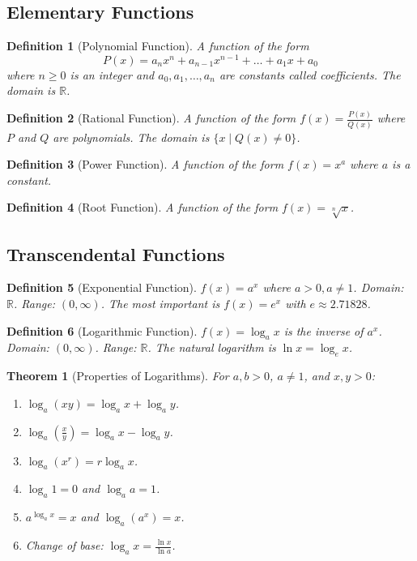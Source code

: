\documentclass[11pt,a4paper]{article}
\newtheorem{theorem}{Theorem}
\newtheorem{definition}{Definition}
\begin{document}
\subsection{Elementary Functions}
\begin{definition}[Polynomial Function]
A function of the form
\[
P(x) = a_n x^n + a_{n-1} x^{n-1} + \dots + a_1 x + a_0
\]
where $n \geq 0$ is an integer and $a_0, a_1, \dots, a_n$ are constants called coefficients. The domain is $\mathbb{R}$.
\end{definition}
\begin{definition}[Rational Function]
A function of the form $f(x) = \frac{P(x)}{Q(x)}$ where $P$ and $Q$ are polynomials. The domain is $\{x \mid Q(x) \neq 0\}$.
\end{definition}
\begin{definition}[Power Function]
A function of the form $f(x) = x^a$ where $a$ is a constant.
\end{definition}
\begin{definition}[Root Function]
A function of the form $f(x) = \sqrt[n]{x}$.
\end{definition}
\subsection{Transcendental Functions}
\begin{definition}[Exponential Function]
$f(x) = a^x$ where $a > 0, a \neq 1$. Domain: $\mathbb{R}$. Range: $(0, \infty)$. The most important is $f(x) = e^x$ with $e \approx 2.71828$.
\end{definition}
\begin{definition}[Logarithmic Function]
$f(x) = \log_a x$ is the inverse of $a^x$. Domain: $(0, \infty)$. Range: $\mathbb{R}$. The natural logarithm is $\ln x = \log_e x$.
\end{definition}
\begin{theorem}[Properties of Logarithms]
For $a, b > 0$, $a \neq 1$, and $x, y > 0$:
\begin{enumerate}
\item $\log_a(xy) = \log_a x + \log_a y$.
\item $\log_a\left(\frac{x}{y}\right) = \log_a x - \log_a y$.
\item $\log_a(x^r) = r \log_a x$.
\item $\log_a 1 = 0$ and $\log_a a = 1$.
\item $a^{\log_a x} = x$ and $\log_a(a^x) = x$.
\item Change of base: $\log_a x = \frac{\ln x}{\ln a}$.
\end{enumerate}
\end{theorem}
\end{document}
